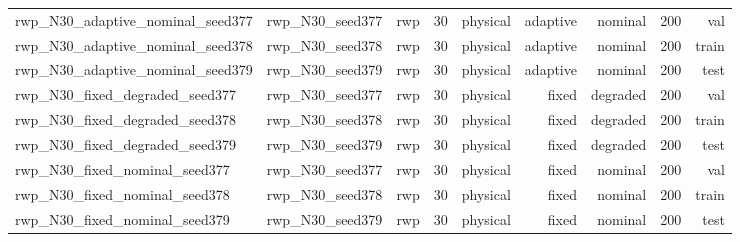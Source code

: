 \begin{tabular}{lrrrrrrrr}
rwp\_N30\_adaptive\_nominal\_seed377 & rwp\_N30\_seed377 & rwp & 30 & physical & adaptive & nominal & 200 & val \\
rwp\_N30\_adaptive\_nominal\_seed378 & rwp\_N30\_seed378 & rwp & 30 & physical & adaptive & nominal & 200 & train \\
rwp\_N30\_adaptive\_nominal\_seed379 & rwp\_N30\_seed379 & rwp & 30 & physical & adaptive & nominal & 200 & test \\
rwp\_N30\_fixed\_degraded\_seed377 & rwp\_N30\_seed377 & rwp & 30 & physical & fixed & degraded & 200 & val \\
rwp\_N30\_fixed\_degraded\_seed378 & rwp\_N30\_seed378 & rwp & 30 & physical & fixed & degraded & 200 & train \\
rwp\_N30\_fixed\_degraded\_seed379 & rwp\_N30\_seed379 & rwp & 30 & physical & fixed & degraded & 200 & test \\
rwp\_N30\_fixed\_nominal\_seed377 & rwp\_N30\_seed377 & rwp & 30 & physical & fixed & nominal & 200 & val \\
rwp\_N30\_fixed\_nominal\_seed378 & rwp\_N30\_seed378 & rwp & 30 & physical & fixed & nominal & 200 & train \\
rwp\_N30\_fixed\_nominal\_seed379 & rwp\_N30\_seed379 & rwp & 30 & physical & fixed & nominal & 200 & test \\
\bottomrule
\end{tabular}